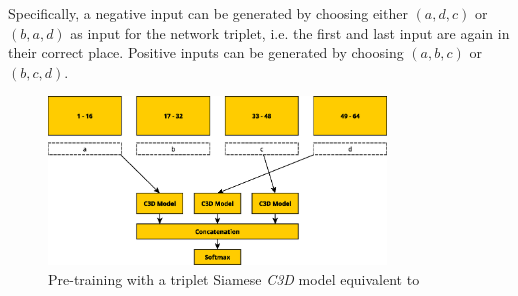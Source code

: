 Specifically, a negative input can be generated by choosing either $(a,d,c)$ or $(b,a,d)$ as input for the network triplet, i.e. the first and last input are again in their correct place.
Positive inputs can be generated by choosing $(a,b,c)$ or $(b,c,d)$.

\begin{figure}[H]
    \centering
    \includegraphics[width=0.8\textwidth]{img_approach/tov_sampling3}
    \caption{Pre-training with a triplet Siamese \textit{C3D} model equivalent to \cite{misra_shuffle_2016}}
    \label{fig:tov_sampling3}
\end{figure}
